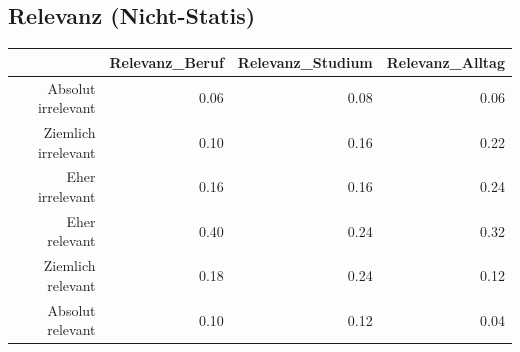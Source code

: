 \documentclass[12pt,a4paper,titlepage=true,parskip,ngerman]{scrartcl}
\begin{document}
\subsection{Relevanz (Nicht-Statis)}
\begin{table}[ht]
\begin{tabular}{rrrr}
  \hline
 & Relevanz\_Beruf & Relevanz\_Studium & Relevanz\_Alltag \\ 
  \hline
Absolut irrelevant & 0.06 & 0.08 & 0.06 \\ 
  Ziemlich irrelevant & 0.10 & 0.16 & 0.22 \\ 
  Eher irrelevant & 0.16 & 0.16 & 0.24 \\ 
  Eher relevant & 0.40 & 0.24 & 0.32 \\ 
  Ziemlich relevant & 0.18 & 0.24 & 0.12 \\ 
  Absolut relevant & 0.10 & 0.12 & 0.04 \\ 
   \hline
\end{tabular}
\end{table}
\end{document}

